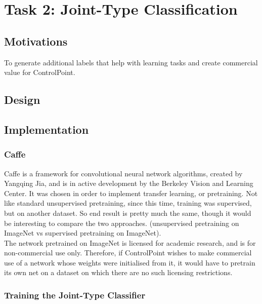 \documentclass[a4paper,11pt]{article}
\begin{document}
\clearpage
\section{Task 2: Joint-Type Classification}

\subsection{Motivations}

To generate additional labels that help with learning tasks and create commercial value for ControlPoint. \\

\subsection{Design}

\subsection{Implementation}

\subsubsection{Caffe}

Caffe is a framework for convolutional neural network algorithms, created by Yangqing Jia, and is in active development by the Berkeley Vision and Learning Center. It was chosen in order to implement transfer learning, or pretraining. Not like standard unsupervised pretraining, since this time, training was supervised, but on another dataset. So end result is pretty much the same, though it would be interesting to compare the two approaches. (unsupervised pretraining on ImageNet vs supervised pretraining on ImageNet). \\
 
The network pretrained on ImageNet is licensed for academic research, and is for non-commercial use only. Therefore, if ControlPoint wishes to make commercial use of a network whose weights were initialised from it, it would have to pretrain its own net on a dataset on which there are no such licensing restrictions. \\






\subsubsection{Training the Joint-Type Classifier}
\end{document}
